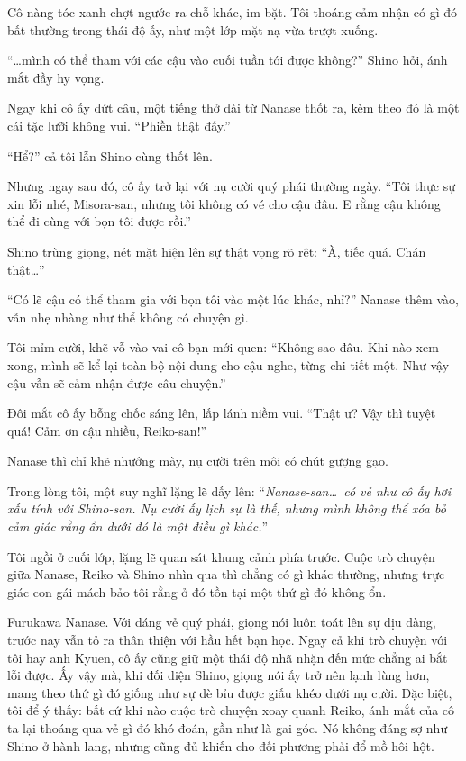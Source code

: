 \documentclass[../main.tex]{subfiles}
\begin{document}
Cô nàng tóc xanh chợt ngước ra chỗ khác, im bặt. Tôi thoáng cảm nhận có gì đó bất thường trong thái độ ấy, như một lớp mặt nạ vừa trượt xuống.

``\dots mình có thể tham với các cậu vào cuối tuần tới được không?'' Shino hỏi, ánh mắt đầy hy vọng.

Ngay khi cô ấy dứt câu, một tiếng thở dài từ Nanase thốt ra, kèm theo đó là một cái tặc lưỡi không vui. ``Phiền thật đấy.''

``Hể?'' cả tôi lẫn Shino cùng thốt lên.

Nhưng ngay sau đó, cô ấy trở lại với nụ cười quý phái thường ngày. ``Tôi thực sự xin lỗi nhé, Misora-san, nhưng tôi không có vé cho cậu đâu. E rằng cậu không thể đi cùng với bọn tôi được rồi.''

Shino trùng giọng, nét mặt hiện lên sự thật vọng rõ rệt: ``À, tiếc quá. Chán thật\dots''

``Có lẽ cậu có thể tham gia với bọn tôi vào một lúc khác, nhỉ?'' Nanase thêm vào, vẫn nhẹ nhàng như thể không có chuyện gì.

Tôi mỉm cười, khẽ vỗ vào vai cô bạn mới quen: ``Không sao đâu. Khi nào xem xong, mình sẽ kể lại toàn bộ nội dung cho cậu nghe, từng chi tiết một. Như vậy cậu vẫn sẽ cảm nhận được câu chuyện.''

Đôi mắt cô ấy bỗng chốc sáng lên, lấp lánh niềm vui. ``Thật ư? Vậy thì tuyệt quá! Cảm ơn cậu nhiều, Reiko-san!''

Nanase thì chỉ khẽ nhướng mày, nụ cười trên môi có chút gượng gạo.

Trong lòng tôi, một suy nghĩ lặng lẽ dấy lên: ``\textit{Nanase-san\dots\ có vẻ như cô ấy hơi xấu tính với Shino-san. Nụ cười ấy lịch sự là thế, nhưng mình không thể xóa bỏ cảm giác rằng ẩn dưới đó là một điều gì khác.}''


Tôi ngồi ở cuối lớp, lặng lẽ quan sát khung cảnh phía trước. Cuộc trò chuyện giữa Nanase, Reiko và Shino nhìn qua thì chẳng có gì khác thường, nhưng trực giác con gái mách bảo tôi rằng ở đó tồn tại một thứ gì đó không ổn.

Furukawa Nanase. Với dáng vẻ quý phái, giọng nói luôn toát lên sự dịu dàng, trước nay vẫn tỏ ra thân thiện với hầu hết bạn học. Ngay cả khi trò chuyện với tôi hay anh Kyuen, cô ấy cũng giữ một thái độ nhã nhặn đến mức chẳng ai bắt lỗi được. Ấy vậy mà, khi đối diện Shino, giọng nói ấy trở nên lạnh lùng hơn, mang theo thứ gì đó giống như sự dè bỉu được giấu khéo dưới nụ cười. Đặc biệt, tôi để ý thấy: bất cứ khi nào cuộc trò chuyện xoay quanh Reiko, ánh mắt của cô ta lại thoáng qua vẻ gì đó khó đoán, gần như là gai góc. Nó không đáng sợ như Shino ở hành lang, nhưng cũng đủ khiến cho đối phương phải đổ mồ hôi hột.
\end{document}
